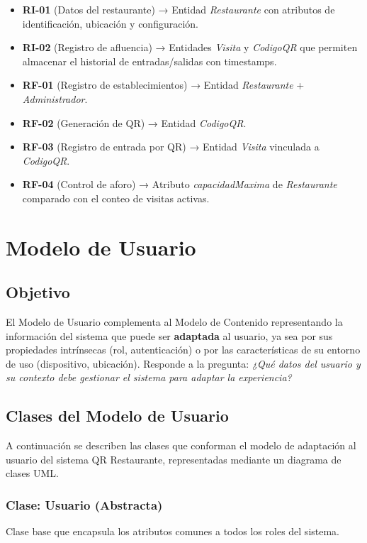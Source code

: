 \begin{itemize}
    \item \textbf{RI-01} (Datos del restaurante) → Entidad \textit{Restaurante} con atributos de identificación, ubicación y configuración.
    \item \textbf{RI-02} (Registro de afluencia) → Entidades \textit{Visita} y \textit{CodigoQR} que permiten almacenar el historial de entradas/salidas con timestamps.
    \item \textbf{RF-01} (Registro de establecimientos) → Entidad \textit{Restaurante} + \textit{Administrador}.
    \item \textbf{RF-02} (Generación de QR) → Entidad \textit{CodigoQR}.
    \item \textbf{RF-03} (Registro de entrada por QR) → Entidad \textit{Visita} vinculada a \textit{CodigoQR}.
    \item \textbf{RF-04} (Control de aforo) → Atributo \textit{capacidadMaxima} de \textit{Restaurante} comparado con el conteo de visitas activas.
\end{itemize}

\section{Modelo de Usuario}

\subsection{Objetivo}
El Modelo de Usuario complementa al Modelo de Contenido representando la información del sistema que puede ser \textbf{adaptada} al usuario, ya sea por sus propiedades intrínsecas (rol, autenticación) o por las características de su entorno de uso (dispositivo, ubicación). Responde a la pregunta: \textit{¿Qué datos del usuario y su contexto debe gestionar el sistema para adaptar la experiencia?} \cite{UWE2014}

\subsection{Clases del Modelo de Usuario}

A continuación se describen las clases que conforman el modelo de adaptación al usuario del sistema QR Restaurante, representadas mediante un diagrama de clases UML.

\subsubsection{Clase: Usuario (Abstracta)}
Clase base que encapsula los atributos comunes a todos los roles del sistema.

